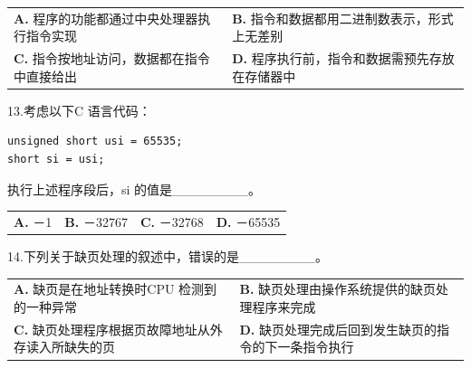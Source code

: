\documentclass[UTF8,11pt]{ctexart}
\begin{document}
\begin{center}\begin{tabular}{>{\raggedright\arraybackslash}p{\dimexpr(\linewidth-4\tabcolsep)/2\relax}>{\raggedright\arraybackslash}p{\dimexpr(\linewidth-4\tabcolsep)/2\relax}}
\textbf{A.} 程序的功能都通过中央处理器执行指令实现 & \textbf{B.} 指令和数据都用二进制数表示，形式上无差别\\[.35em]
\textbf{C.} 指令按地址访问，数据都在指令中直接给出 & \textbf{D.} 程序执行前，指令和数据需预先存放在存储器中\\[.35em]\end{tabular}\end{center}

13.考虑以下C 语言代码：


\begin{Verbatim}[breaklines,breakanywhere,fontsize=\small]
unsigned short usi = 65535;
short si = usi;
\end{Verbatim}

执行上述程序段后，si 的值是\_\_\_\_\_\_\_\_。


\begin{center}\begin{tabular}{>{\raggedright\arraybackslash}p{\dimexpr(\linewidth-8\tabcolsep)/4\relax}>{\raggedright\arraybackslash}p{\dimexpr(\linewidth-8\tabcolsep)/4\relax}>{\raggedright\arraybackslash}p{\dimexpr(\linewidth-8\tabcolsep)/4\relax}>{\raggedright\arraybackslash}p{\dimexpr(\linewidth-8\tabcolsep)/4\relax}}
\textbf{A.} －1 & \textbf{B.} －32767 & \textbf{C.} －32768 & \textbf{D.} －65535\\[.35em]\end{tabular}\end{center}

14.下列关于缺页处理的叙述中，错误的是\_\_\_\_\_\_\_\_。


\begin{center}\begin{tabular}{>{\raggedright\arraybackslash}p{\dimexpr(\linewidth-4\tabcolsep)/2\relax}>{\raggedright\arraybackslash}p{\dimexpr(\linewidth-4\tabcolsep)/2\relax}}
\textbf{A.} 缺页是在地址转换时CPU 检测到的一种异常 & \textbf{B.} 缺页处理由操作系统提供的缺页处理程序来完成\\[.35em]
\textbf{C.} 缺页处理程序根据页故障地址从外存读入所缺失的页 & \textbf{D.} 缺页处理完成后回到发生缺页的指令的下一条指令执行\\[.35em]\end{tabular}\end{center}
\end{document}
